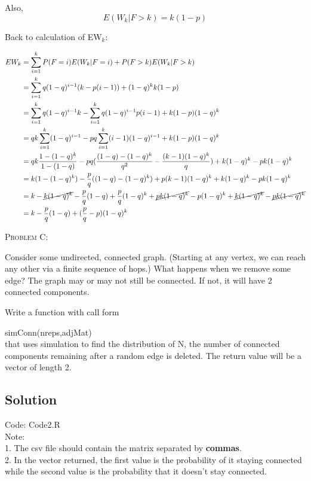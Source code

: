 \documentclass[12pt]{article}
\newenvironment{statement}[1]
{\begin{mdframed}[linewidth=0.6pt]
        \textsc{ #1:}

}
    {\end{mdframed}}
\begin{document}
Also, 
\begin{equation}
E(W_k|F>k) = k(1-p)
\end{equation}

Back to calculation of EW$_k$:

\begin{equation}
\begin{split}
EW_k & = \sum_{i=1}^kP(F=i)E(W_k|F=i) + P(F>k)E(W_k|F>k) \\
     & = \sum_{i=1}^kq(1-q)^{i-1}(k-p(i-1)) + (1-q)^{k}k(1-p) \\
     & = \sum_{i=1}^kq(1-q)^{i-1}k-\sum_{i=1}^kq(1-q)^{i-1}p(i-1) + k(1-p)(1-q)^{k} \\
     & = qk\sum_{i=1}^k(1-q)^{i-1}-pq\sum_{i=1}^k(i-1)(1-q)^{i-1} + k(1-p)(1-q)^{k} \\
     & = qk\frac{1-(1-q)^k}{1-(1-q)}-pq(\frac{(1-q)-(1-q)^k}{q^2}-\frac{(k-1)(1-q)^k}{q})+k(1-q)^k-pk(1-q)^k \\
     & = k(1-(1-q)^k) - \frac{p}{q}((1-q)-(1-q)^k)+p(k-1)(1-q)^k + k(1-q)^k - pk(1-q)^k \\
     & = k - \cancel{k(1-q)^k}  - \frac{p}{q}(1-q) + \frac{p}{q}(1-q)^k + \cancel{pk(1-q)^k} - p(1-q)^k + \cancel{k(1-q)^k}- \cancel{pk(1-q)^k} \\ 
     & = k - \frac{p}{q}(1-q) + (\frac{p}{q}-p)(1-q)^k
\end{split}
\end{equation}
\newpage
\begin{statement}{Problem C}
Consider some undirected, connected graph. (Starting at any vertex, we can reach any other via a finite sequence of hops.) What happens when we remove some edge? The graph may or may not still be connected. If not, it will have 2 connected components.

Write a function with call form

simConn(nreps,adjMat)\\
that uses simulation to find the distribution of N, the number of connected components remaining after a random edge is deleted. The return value will be a vector of length 2.    
\end{statement}
\subsection*{Solution}
Code: Code2.R\\
Note:\\
1. The csv file should contain the matrix separated by \textbf{commas}. \\
2. In the vector returned, the first value is the probability of it staying connected while the second value is the probability that it doesn't stay connected.\\
\end{document}
